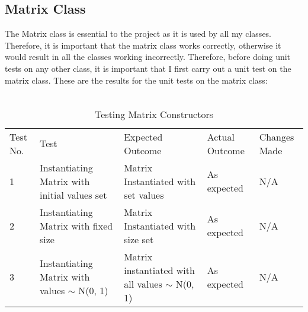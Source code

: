 \subsection{Matrix Class}
The Matrix class is essential to the project as it is used by all my classes. Therefore, it is important that the matrix class works correctly, otherwise it would result in all the classes working incorrectly. Therefore, before doing unit tests on any other class, it is important that I first carry out a unit test on the matrix class. These are the results for the unit tests on the matrix class:
\\ \\
\begin{table}[H]
\centering
    \begin{tabular}{|p{1cm}|p{4cm}|p{4cm}|p{3cm}|p{2cm}|}
        \hline
        Test No. & Test & Expected Outcome & Actual Outcome & Changes Made \\ \cline{1-5} 
        1 & Instantiating Matrix with initial values set & Matrix Instantiated with set values & As expected & N/A \\ \cline{1-5}
        2 & Instantiating Matrix with fixed size & Matrix Instantiated with size set & As expected & N/A \\
        \cline{1-5}
        3 & Instantiating Matrix with values $\sim$ N(0, 1) & Matrix instantiated with all values $\sim$ N(0, 1)  & As expected & N/A \\ \cline{1-5}
    \end{tabular}
    \caption{Testing Matrix Constructors}
    \vspace{0.5cm}


\end{table}

